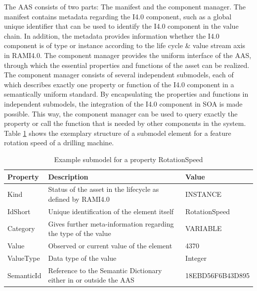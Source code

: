 The \ac{AAS} consists of two parts: The manifest and the component manager. The manifest contains metadata regarding the \ac{I4.0} component, such as a global unique identifier that can be used to identify the \ac{I4.0} component in the value chain. In addition, the metadata provides information whether the \ac{I4.0} component is of type or instance according to the life cycle \& value stream axis in \ac{RAMI4.0}. The component manager provides the uniform interface of the \ac{AAS}, through which the essential properties and functions of the asset can be realized. The component manager consists of several independent submodels, each of which describes exactly one property or function of the \ac{I4.0} component in a semantically uniform standard. By encapsulating the properties and functions in independent submodels, the integration of the \ac{I4.0} component in \ac{SOA} is made possible. This way, the component manager can be used to query exactly the property or call the function that is needed by other components in the system. Table \ref{tab:rotationspeedex} shows the exemplary structure of a submodel element for a feature rotation speed of a drilling machine.

\begin{table}[ht]
    \centering
    \begin{tabular}{|l||m{6cm}||l|}
    \hline
        \textbf{Property} & \textbf{Description} & \textbf{Value} \\ \hline
        Kind & Status of the asset in the lifecycle as defined by \ac{RAMI4.0} & INSTANCE  \\ \hline
        IdShort & Unique identification of the element itself & RotationSpeed  \\ \hline
        Category & Gives further meta-information regarding the type of the value & VARIABLE  \\ \hline
        Value & Observed or current value of the element & 4370   \\ \hline
        ValueType & Data type of the value & Integer\\ \hline
        SemanticId & Reference to the Semantic Dictionary either in or outside the \ac{AAS} & 18EBD56F6B43D895 \\ \hline
    \end{tabular}
    \caption{Example submodel for a property RotationSpeed}
    \label{tab:rotationspeedex}
\end{table}



